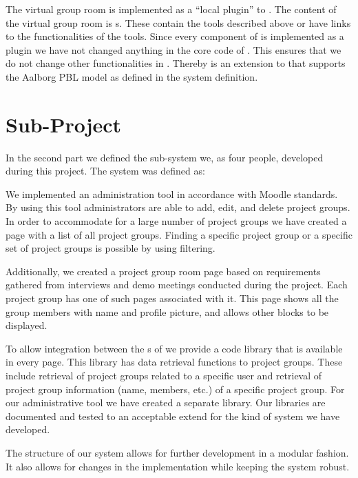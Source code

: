 
The virtual group room is implemented as a ``local plugin'' to \moodle{}.
The content of the virtual group room is \block{}s.
These contain the tools described above or have links to the functionalities of the tools.
Since every component of \system{} is implemented as a \moodle{} plugin we have not changed anything in the core code of \moodle{}.
This ensures that we do not change other functionalities in \moodle{}.
Thereby \system{} is an extension to \moodle{} that supports the Aalborg PBL model as defined in the system definition.

\section{Sub-Project}
\label{sec:subconclusion}

In the second part we defined the sub-system we, as four people, developed during this project.
The system was defined as:



We implemented an administration tool in accordance with Moodle standards.
By using this tool administrators are able to add, edit, and delete project groups.
In order to accommodate for a large number of project groups we have created a page with a list of all project groups.
Finding a specific project group or a specific set of project groups is possible by using filtering.

Additionally, we created a project group room page based on requirements gathered from interviews and demo meetings conducted during the project.
Each project group has one of such pages associated with it.
This page shows all the group members with name and profile picture, and allows other \system{} blocks to be displayed.

To allow integration between the \subsystem{}s of \system{} we provide a code library that is available in every \moodle{} page.
This library has data retrieval functions to project groups.
These include retrieval of project groups related to a specific user and retrieval of project group information (name, members, etc.) of a specific project group.
For our administrative tool we have created a separate library.
Our libraries are documented and tested to an acceptable extend for the kind of system we have developed.

The structure of our system allows for further development in a modular fashion.
It also allows for changes in the implementation while keeping the system robust.











